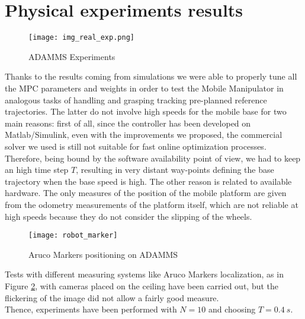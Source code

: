 \section{Physical experiments results}
\begin{figure}[h!]
\centering
\texttt{[image: img\_real\_exp.png]}
\caption{ADAMMS Experiments}
\label{img_real_exp}
\end{figure}
Thanks to the results coming from simulations we were able to properly tune all the MPC parameters and weights in order to test the Mobile Manipulator in analogous tasks of handling and grasping tracking pre-planned reference trajectories. The latter do not involve high speeds for the mobile base for two main reasons: first of all, since the controller has been developed on Matlab/Simulink, even with the improvements we proposed, the commercial solver we used is still not suitable for fast online optimization processes. Therefore, being bound by the software availability point of view, we had to keep an high time step $T$, resulting in very distant way-points defining the base trajectory when the base speed is high. The other reason is related to available hardware.
The only measures of the position of the mobile platform are given from the odometry measurements of the platform itself, which are not reliable at high speeds because they do not consider the slipping of the wheels. 
\begin{figure}[h!]
\centering
\texttt{[image: robot\_marker]}
\caption{Aruco Markers positioning on ADAMMS}
\label{robot_marker}
\end{figure} Tests with different measuring systems like Aruco Markers localization, as in Figure \ref{robot_marker}, with cameras placed on the ceiling have been carried out, but the flickering of the image did not allow a fairly good measure.\\
Thence, experiments have been performed with $N=10$ and choosing $T=0.4\ s$.

